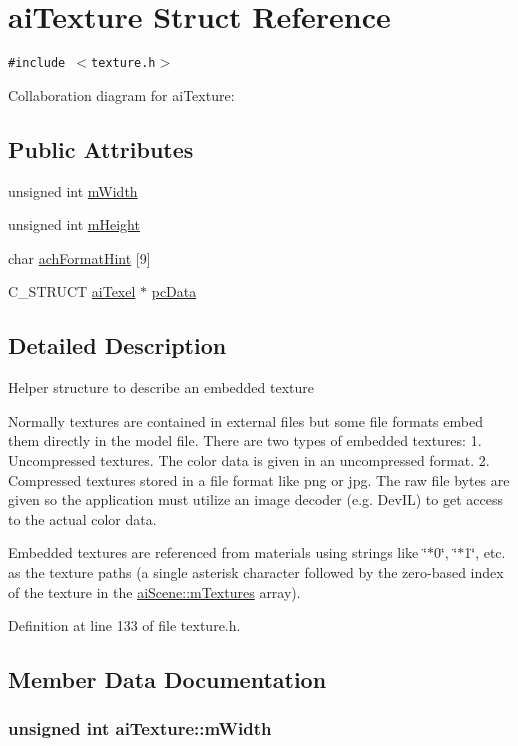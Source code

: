 \hypertarget{structai_texture}{
\section{aiTexture Struct Reference}
\label{structai_texture}
}
{\tt \#include $<$texture.h$>$}

Collaboration diagram for aiTexture:\subsection*{Public Attributes}
\begin{CompactItemize}
\item 
unsigned int \hyperlink{structai_texture_aa3ad8cfe44fdc4dea2db91977d92234}{mWidth}
\item 
unsigned int \hyperlink{structai_texture_c1e2fa6f1f646e9c55e3985d4418a752}{mHeight}
\item 
char \hyperlink{structai_texture_8e281d19486df620af1b2869464fa5c0}{achFormatHint} \mbox{[}9\mbox{]}
\item 
C\_\-STRUCT \hyperlink{structai_texel}{aiTexel} $\ast$ \hyperlink{structai_texture_eb07528748b6e49d2d81c60006024f9a}{pcData}
\end{CompactItemize}


\subsection{Detailed Description}
Helper structure to describe an embedded texture

Normally textures are contained in external files but some file formats embed them directly in the model file. There are two types of embedded textures: 1. Uncompressed textures. The color data is given in an uncompressed format. 2. Compressed textures stored in a file format like png or jpg. The raw file bytes are given so the application must utilize an image decoder (e.g. DevIL) to get access to the actual color data.

Embedded textures are referenced from materials using strings like \char`\"{}$\ast$0\char`\"{}, \char`\"{}$\ast$1\char`\"{}, etc. as the texture paths (a single asterisk character followed by the zero-based index of the texture in the \hyperlink{structai_scene_0fd0d29fbc439e3715b4975ccb68d2d3}{aiScene::mTextures} array). 

Definition at line 133 of file texture.h.

\subsection{Member Data Documentation}
\hypertarget{structai_texture_aa3ad8cfe44fdc4dea2db91977d92234}{
\subsubsection[mWidth]{\setlength{\rightskip}{0pt plus 5cm}unsigned int {\bf aiTexture::mWidth}}}
\label{structai_texture_aa3ad8cfe44fdc4dea2db91977d92234}


